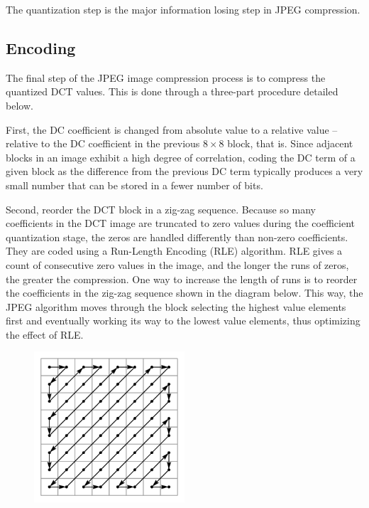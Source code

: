 The quantization step is the major information losing step in JPEG
compression.


\subsection{Encoding}

The final step of the JPEG image compression process is to compress the quantized DCT values. This is done through a three-part procedure detailed below.

First, the DC coefficient is changed from absolute value to a relative value – relative to the DC coefficient in the previous $8 \times 8$ block, that is. Since adjacent blocks in an image exhibit a high degree of correlation, coding the DC term of a given block as the difference from the previous DC term typically produces a very small number that can be stored in a fewer number of bits.

Second, reorder the DCT block in a zig-zag sequence. Because so many coefficients in the DCT image are truncated to zero values during the coefficient quantization stage, the zeros are handled differently than non-zero coefficients. They are coded using a Run-Length Encoding (RLE) algorithm. RLE gives a count of consecutive zero values in the image, and the longer the runs of zeros, the greater the compression. One way to increase the length of runs is to reorder the coefficients in the zig-zag sequence shown in the diagram below. This way, the JPEG algorithm moves through the block selecting the highest value elements first and eventually working its way to the lowest value elements, thus optimizing the effect of RLE.

\begin{figure}[!ht]
    \centering
    \includegraphics[width=0.50\textwidth]{fig/3-4.png}
    \label{fig:zig-zag}
\end{figure}

